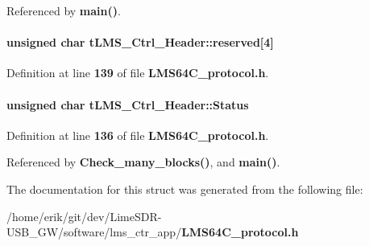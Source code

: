 Referenced by {\bf main()}.

\paragraph[{reserved}]{\setlength{\rightskip}{0pt plus 5cm}unsigned char t\+L\+M\+S\+\_\+\+Ctrl\+\_\+\+Header\+::reserved[4]}\label{structtLMS__Ctrl__Header_aaaa6d5a69c4dc9ddcb9993f054d56e91}


Definition at line {\bf 139} of file {\bf L\+M\+S64\+C\+\_\+protocol.\+h}.

\paragraph[{Status}]{\setlength{\rightskip}{0pt plus 5cm}unsigned char t\+L\+M\+S\+\_\+\+Ctrl\+\_\+\+Header\+::\+Status}\label{structtLMS__Ctrl__Header_a193449341e5a04aa0ef8846e5fb86126}


Definition at line {\bf 136} of file {\bf L\+M\+S64\+C\+\_\+protocol.\+h}.



Referenced by {\bf Check\+\_\+many\+\_\+blocks()}, and {\bf main()}.



The documentation for this struct was generated from the following file\+:\begin{DoxyCompactItemize}
\item 
/home/erik/git/dev/\+Lime\+S\+D\+R-\/\+U\+S\+B\+\_\+\+G\+W/software/lms\+\_\+ctr\+\_\+app/{\bf L\+M\+S64\+C\+\_\+protocol.\+h}\end{DoxyCompactItemize}
